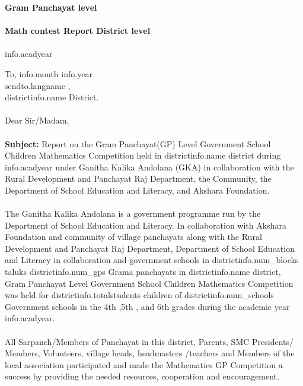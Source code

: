 \documentclass[12pt]{article}
\begin{document}
\begin{titlepage}
    \thispagestyle{title}
    \begin{center}
    \vspace*{10.5cm}
     \textbf{\huge Gram Panchayat level} \\~\\
        \textbf{\huge Math contest Report District level} \\~\\
	    \Large{{info.acadyear}}
    \end{center}
\end{titlepage}
\pagebreak

\thispagestyle{plain}
{
\setlength{\parindent}{0in}
To, \hfill  {{info.month}} {{info.year}} \\ [2ex]
{{sendto.langname}} ,\\ [1ex]
{{districtinfo.name}} District.
\\~\\ [3ex]
Dear Sir/Madam,
\\~\\
\textbf{Subject:} Report on the Gram Panchayat(GP) Level Government School Children Mathematics Competition held in {{districtinfo.name}} district during {{info.acadyear}} under Ganitha Kalika Andolana (GKA) in collaboration with the Rural Development and Panchayat Raj Department, the Community, the Department of School Education and Literacy, and Akshara Foundation.
\\~\\[3ex]
The Ganitha Kalika Andolana is a government programme run by the Department of School Education and Literacy. In collaboration with Akshara Foundation and community of village panchayats along with the Rural Development and Panchayat Raj Department, Department of School Education and Literacy in collaboration and  government schools in {{districtinfo.num_blocks}} taluks {{districtinfo.num_gps}} Grama panchayats in {{districtinfo.name}} district,  Gram Panchayat Level Government School Children Mathematics Competition was held for {{districtinfo.totalstudents}} children of {{districtinfo.num_schools}} Government schools  in the 4th ,5th , and 6th  grades during the academic year {{info.acadyear}}.
\\~\\[2ex]
All Sarpanch/Members of Panchayat in this district, Parents, SMC Presidents/ Members, Volunteers, village heads, headmasters /teachers and Members of the local association participated and made the Mathematics GP Competition a success by providing the needed  resources, cooperation and encouragement.
}
\end{document}
